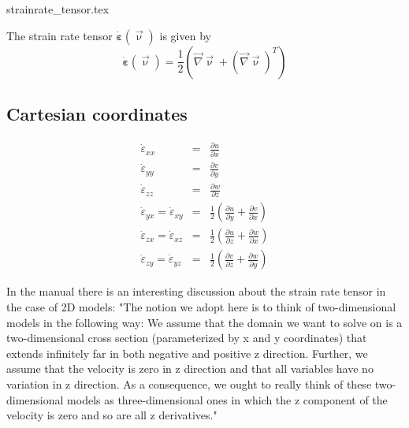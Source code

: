 \begin{flushright} {\tiny {\color{gray} strainrate\_tensor.tex}} \end{flushright}


The strain rate tensor $\dot{\bm\varepsilon}(\vec\upnu)$ is given by
\begin{equation}
\dot{\bm \varepsilon}({\vec \upnu}) = \frac{1}{2}( {\vec \nabla}{\vec \upnu}+ ({\vec \nabla}{\vec \upnu})^T) 
\end{equation}

\subsection{Cartesian coordinates}
\begin{eqnarray}
\dot\varepsilon_{xx} &=& \frac{\partial u}{\partial x} \\
\dot\varepsilon_{yy} &=& \frac{\partial v}{\partial y} \\
\dot\varepsilon_{zz} &=& \frac{\partial w}{\partial z} \\
\dot\varepsilon_{yx} =
\dot\varepsilon_{xy} &=& \frac{1}{2} \left( \frac{\partial u}{\partial y} + \frac{\partial v}{\partial x}  \right)\\
\dot\varepsilon_{zx} =
\dot\varepsilon_{xz} &=& \frac{1}{2} \left( \frac{\partial u}{\partial z} + \frac{\partial w}{\partial x}  \right)\\
\dot\varepsilon_{zy} =
\dot\varepsilon_{yz} &=& \frac{1}{2} \left( \frac{\partial v}{\partial z} + \frac{\partial w}{\partial y}  \right)
\end{eqnarray}

In the \aspect manual there is an interesting discussion about the strain rate tensor in the case of 
2D models: "The notion we adopt here is to think of two-dimensional models in the following way: 
We assume that the domain we want to solve on is a two-dimensional
cross section (parameterized by x and y coordinates) that extends infinitely far in both negative and positive
z direction. Further, we assume that the velocity is zero in z direction and that all variables have no
variation in z direction. As a consequence, we ought to really think of these two-dimensional models as
three-dimensional ones in which the z component of the velocity is zero and so are all z derivatives."

